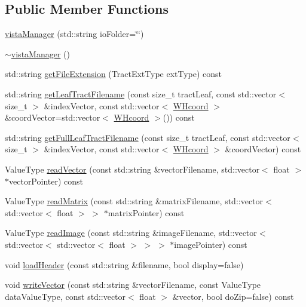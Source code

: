 \subsection*{\-Public \-Member \-Functions}
\begin{DoxyCompactItemize}
\item 
\hyperlink{classvistaManager_a458979d81ecf1e53518c881f68300430}{vista\-Manager} (std\-::string io\-Folder=\char`\"{}\char`\"{})
\item 
\hyperlink{classvistaManager_a58fc280642b2269abf444f78267ed813}{$\sim$vista\-Manager} ()
\item 
std\-::string \hyperlink{classvistaManager_a5e52fed6323e11f13b5952bdb44ee6de}{get\-File\-Extension} (\-Tract\-Ext\-Type ext\-Type) const 
\item 
std\-::string \hyperlink{classvistaManager_a407d30a5fffffe195fdcb6c6c7915603}{get\-Leaf\-Tract\-Filename} (const size\-\_\-t tract\-Leaf, const std\-::vector$<$ size\-\_\-t $>$ \&index\-Vector, const std\-::vector$<$ \hyperlink{classWHcoord}{\-W\-Hcoord} $>$ \&coord\-Vector=std\-::vector$<$ \hyperlink{classWHcoord}{\-W\-Hcoord} $>$()) const 
\item 
std\-::string \hyperlink{classvistaManager_abe8c9c35fd44694320e07d56c8c7cc1a}{get\-Full\-Leaf\-Tract\-Filename} (const size\-\_\-t tract\-Leaf, const std\-::vector$<$ size\-\_\-t $>$ \&index\-Vector, const std\-::vector$<$ \hyperlink{classWHcoord}{\-W\-Hcoord} $>$ \&coord\-Vector) const 
\item 
\-Value\-Type \hyperlink{classvistaManager_a3b7961506874a82c9cd03d63f9453ef6}{read\-Vector} (const std\-::string \&vector\-Filename, std\-::vector$<$ float $>$ $\ast$vector\-Pointer) const 
\item 
\-Value\-Type \hyperlink{classvistaManager_a11963066feafb09ce08be36a81d4b218}{read\-Matrix} (const std\-::string \&matrix\-Filename, std\-::vector$<$ std\-::vector$<$ float $>$ $>$ $\ast$matrix\-Pointer) const 
\item 
\-Value\-Type \hyperlink{classvistaManager_a63e720f7d61fe55af1aebad4602f450e}{read\-Image} (const std\-::string \&image\-Filename, std\-::vector$<$ std\-::vector$<$ std\-::vector$<$ float $>$ $>$ $>$ $\ast$image\-Pointer) const 
\item 
void \hyperlink{classvistaManager_aa154ab71f5179e8de436a29387a14ed6}{load\-Header} (const std\-::string \&filename, bool display=false)
\item 
void \hyperlink{classvistaManager_a1863d9fa2c828230530c811c75bd335a}{write\-Vector} (const std\-::string \&vector\-Filename, const \-Value\-Type data\-Value\-Type, const std\-::vector$<$ float $>$ \&vector, bool do\-Zip=false) const 

\end{DoxyCompactItemize}

